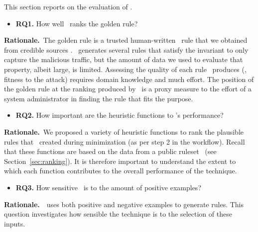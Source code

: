\documentclass[conference]{IEEEtran}
\begin{document}
This section reports on the evaluation of \tname{}.


\newcommand{\textRQone}{How well \tname\ ranks the golden rule?}
\begin{itemize}[leftmargin=*,label={}]
\item{\textbf{RQ1.}} \textRQone
\end{itemize}

\noindent
\textbf{Rationale.}~The golden rule is a trusted human-written
\nids\ rule that we obtained from credible sources . \tname\ generates
several rules that satisfy the invariant to only capture the malicious
traffic, but the amount of data we used to evaluate that property,
albeit large, is limited. Assessing the quality of each rule
\tname\ produces (\ie{}, fitness to the attack) requires domain
knowledge and much effort. The position of the golden rule at the
ranking produced by \tname\ is a proxy measure to the effort of a
system administrator in finding the rule that fits the purpose.


\newcommand{\textRQtwo}{How important are the heuristic functions
  to \tname's performance?}
\begin{itemize}[leftmargin=*,label={}]
\item{\textbf{RQ2.}} \textRQtwo\
\end{itemize}

\noindent
\textbf{Rationale.}~We proposed a variety of heuristic functions to
rank the plausible rules that \tname\ created during minimization (as
per step 2 in the workflow). Recall that these functions are based on
the data from a public ruleset~\cite{emerging-threats-open} (see
Section~\ref{sec:ranking}). It is therefore important to understand
the extent to which each function contributes to the overall
performance of the technique.

\newcommand{\textRQthree}{How sensitive \tname\ is to the amount of
  positive examples?} 
\begin{itemize}[leftmargin=*,label={}]
\item{\textbf{RQ3.}} \textRQthree\
\end{itemize}

\noindent
\textbf{Rationale.}~\tname\ uses both positive and negative examples
to generate rules. This question investigates how sensible the
technique is to the selection of these inputs.
\noindent
\vspace{1ex}
\end{document}
